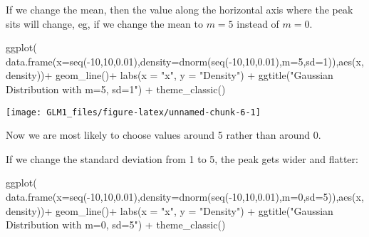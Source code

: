 \documentclass[
]{article}
\newenvironment{Shaded}{\begin{snugshade}}{\end{snugshade}}
\newcommand{\AttributeTok}[1]{\textcolor[rgb]{0.77,0.63,0.00}{#1}}
\newcommand{\DecValTok}[1]{\textcolor[rgb]{0.00,0.00,0.81}{#1}}
\newcommand{\FloatTok}[1]{\textcolor[rgb]{0.00,0.00,0.81}{#1}}
\newcommand{\FunctionTok}[1]{\textcolor[rgb]{0.00,0.00,0.00}{#1}}
\newcommand{\NormalTok}[1]{#1}
\newcommand{\SpecialCharTok}[1]{\textcolor[rgb]{0.00,0.00,0.00}{#1}}
\newcommand{\StringTok}[1]{\textcolor[rgb]{0.31,0.60,0.02}{#1}}
\begin{document}
If we change the mean, then the value along the horizontal axis where
the peak sits will change, eg, if we change the mean to \(m=5\) instead
of \(m=0\).

\begin{Shaded}
\begin{Highlighting}[]
\FunctionTok{ggplot}\NormalTok{(}
  \FunctionTok{data.frame}\NormalTok{(}\AttributeTok{x=}\FunctionTok{seq}\NormalTok{(}\SpecialCharTok{{-}}\DecValTok{10}\NormalTok{,}\DecValTok{10}\NormalTok{,}\FloatTok{0.01}\NormalTok{),}\AttributeTok{density=}\FunctionTok{dnorm}\NormalTok{(}\FunctionTok{seq}\NormalTok{(}\SpecialCharTok{{-}}\DecValTok{10}\NormalTok{,}\DecValTok{10}\NormalTok{,}\FloatTok{0.01}\NormalTok{),}\AttributeTok{m=}\DecValTok{5}\NormalTok{,}\AttributeTok{sd=}\DecValTok{1}\NormalTok{)),}\FunctionTok{aes}\NormalTok{(x,density))}\SpecialCharTok{+}
  \FunctionTok{geom\_line}\NormalTok{()}\SpecialCharTok{+}
  \FunctionTok{labs}\NormalTok{(}\AttributeTok{x =} \StringTok{"x"}\NormalTok{, }\AttributeTok{y =} \StringTok{"Density"}\NormalTok{) }\SpecialCharTok{+}
      \FunctionTok{ggtitle}\NormalTok{(}\StringTok{"Gaussian Distribution with m=5, sd=1"}\NormalTok{) }\SpecialCharTok{+}
      \FunctionTok{theme\_classic}\NormalTok{()}
\end{Highlighting}
\end{Shaded}

\begin{center}\texttt{[image: GLM1\_files/figure-latex/unnamed-chunk-6-1]} \end{center}

Now we are most likely to choose values around 5 rather than around 0.

If we change the standard deviation from 1 to 5, the peak gets wider and
flatter:

\begin{Shaded}
\begin{Highlighting}[]
\FunctionTok{ggplot}\NormalTok{(}
  \FunctionTok{data.frame}\NormalTok{(}\AttributeTok{x=}\FunctionTok{seq}\NormalTok{(}\SpecialCharTok{{-}}\DecValTok{10}\NormalTok{,}\DecValTok{10}\NormalTok{,}\FloatTok{0.01}\NormalTok{),}\AttributeTok{density=}\FunctionTok{dnorm}\NormalTok{(}\FunctionTok{seq}\NormalTok{(}\SpecialCharTok{{-}}\DecValTok{10}\NormalTok{,}\DecValTok{10}\NormalTok{,}\FloatTok{0.01}\NormalTok{),}\AttributeTok{m=}\DecValTok{0}\NormalTok{,}\AttributeTok{sd=}\DecValTok{5}\NormalTok{)),}\FunctionTok{aes}\NormalTok{(x,density))}\SpecialCharTok{+}
  \FunctionTok{geom\_line}\NormalTok{()}\SpecialCharTok{+}
  \FunctionTok{labs}\NormalTok{(}\AttributeTok{x =} \StringTok{"x"}\NormalTok{, }\AttributeTok{y =} \StringTok{"Density"}\NormalTok{) }\SpecialCharTok{+}
      \FunctionTok{ggtitle}\NormalTok{(}\StringTok{"Gaussian Distribution with m=0, sd=5"}\NormalTok{) }\SpecialCharTok{+}
      \FunctionTok{theme\_classic}\NormalTok{()}
\end{Highlighting}
\end{Shaded}
\end{document}
